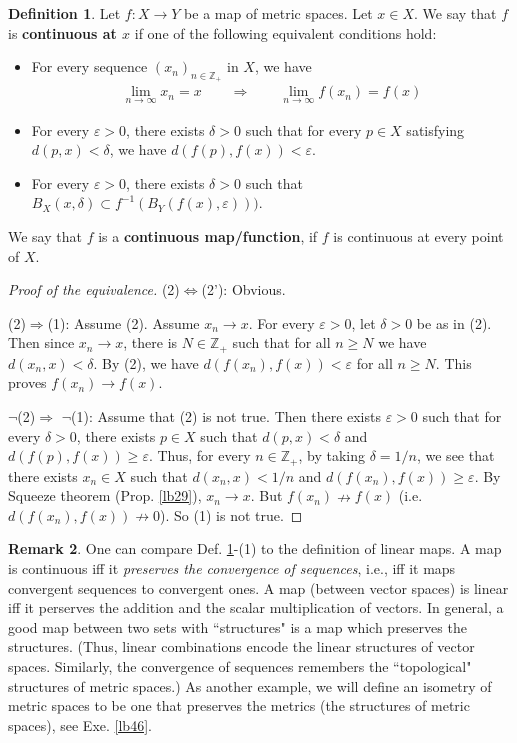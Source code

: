 \documentclass[12pt,b5paper,notitlepage]{article}
\theoremstyle{definition}
\newtheorem{df}{Definition}[section]
\newtheorem{rem}[df]{Remark}
\theoremstyle{plain}
\newcommand{\Zbb}{\mathbb Z}
\numberwithin{equation}{section}
\begin{document}
\begin{df}\label{lb31}
Let $f:X\rightarrow Y$ be a map of metric spaces. Let $x\in X$. We say that $f$ is \textbf{continuous at $x$} if one of the following equivalent conditions hold:
\begin{itemize}[align=left]
\item [(1)] For every sequence $(x_n)_{n\in\Zbb_+}$ in $X$, we have
\begin{align*}
\lim_{n\rightarrow\infty} x_n=x\qquad\Longrightarrow\qquad \lim_{n\rightarrow\infty} f(x_n)=f(x)
\end{align*}
\item[(2)] For every $\varepsilon>0$, there exists $\delta>0$ such that for every $p\in X$ satisfying $d(p,x)<\delta$, we have $d(f(p),f(x))<\varepsilon$.
\item[(2')] For every $\varepsilon>0$, there exists $\delta>0$ such that $B_X(x,\delta)\subset f^{-1}(B_Y(f(x),\varepsilon)))$.
\end{itemize}
We say that $f$ is a \textbf{continuous map/function}, if $f$ is continuous at every point of $X$.
\end{df}

\begin{proof}[Proof of the equivalence]
(2)$\Leftrightarrow$(2'): Obvious.

(2)$\Rightarrow$(1): Assume (2). Assume $x_n\rightarrow x$. For every $\varepsilon>0$, let $\delta>0$ be as in (2). Then since $x_n\rightarrow x$, there is $N\in\Zbb_+$ such that for all $n\geq N$ we have $d(x_n,x)<\delta$. By (2), we have $d(f(x_n),f(x))<\varepsilon$ for all $n\geq N$. This proves $f(x_n)\rightarrow f(x)$.

$\neg$(2)$\Rightarrow$ $\neg$(1): Assume that (2) is not true. Then there exists $\varepsilon>0$ such that for every $\delta>0$, there exists $p\in X$ such that $d(p,x)<\delta$ and $d(f(p),f(x))\geq\varepsilon$. Thus, for every $n\in\Zbb_+$, by taking $\delta=1/n$, we see that there exists $x_n\in X$ such that $d(x_n,x)<1/n$ and $d(f(x_n),f(x))\geq\varepsilon$. By Squeeze theorem (Prop. \ref{lb29}), $x_n\rightarrow x$. But $f(x_n)\nrightarrow f(x)$ (i.e. $d(f(x_n),f(x))\nrightarrow 0$). So (1) is not true.
\end{proof}

\begin{rem}
One can compare Def. \ref{lb31}-(1) to the definition of linear maps. A map is continuous iff it \emph{preserves the convergence of sequences}, i.e., iff it maps convergent sequences to convergent ones. A map (between vector spaces) is linear iff it perserves the addition and the scalar multiplication of vectors. In general, a good map between two sets with ``structures" is a map which preserves the structures. (Thus, linear combinations encode the linear structures of vector spaces. Similarly, the convergence of sequences remembers the ``topological" structures of metric spaces.) As another example, we will define an isometry of metric spaces to be one that preserves the metrics (the structures of metric spaces), see Exe. \ref{lb46}.
\end{rem}
\end{document}
